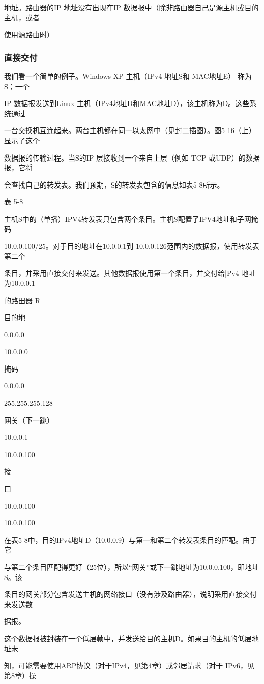 地址。路由器的IP 地址没有出现在IP 数据报中（除非路由器自己是源主机或目的主机，或者

使用源路由时）

\subsubsection{直接交付}
我们看一个简单的例子。Windows XP 主机（IPv4 地址S和 MAC地址E） 称为S；一个

IP 数据报发送到Linux 主机（IPv4地址D和MAC地址D），该主机称为D。这些系统通过

一台交换机互连起来。两台主机都在同一以太网中（见封二插图）。图5-16（上）显示了这个

数据报的传输过程。当S的IP 层接收到一个来自上层（例如 TCP 或UDP）的数据报，它将

会查找自己的转发表。我们预期，S的转发表包含的信息如表5-8所示。

表 5-8

主机S中的（单播）IPV4转发表只包含两个条目。主机S配置了IPV4地址和子网掩码

10.0.0.100/25。对于目的地址在10.0.0.1到 10.0.0.126范围内的数据报，使用转发表第二个

条目，并采用直接交付来发送。其他数据报使用第一个条目，并交付给|Pv4 地址为10.0.0.1

的路田器 R

目的地

0.0.0.0

10.0.0.0

掩码

0.0.0.0

255.255.255.128

网关（下一跳）

10.0.0.1

10.0.0.100

接

口

10.0.0.100

10.0.0.100

在表5-8中，目的IPv4地址D（10.0.0.9）与第一和第二个转发表条目的匹配。由于它

与第二个条目匹配得更好（25位），所以“网关”或下一跳地址为10.0.0.100，即地址S。该

条目的网关部分包含发送主机的网络接口（没有涉及路由器），说明采用直接交付来发送数

据报。

这个数据报被封装在一个低层帧中，并发送给目的主机D。如果目的主机的低层地址未

知，可能需要使用ARP协议（对于IPv4，见第4章）或邻居请求（对于 IPv6，见第8章）操

